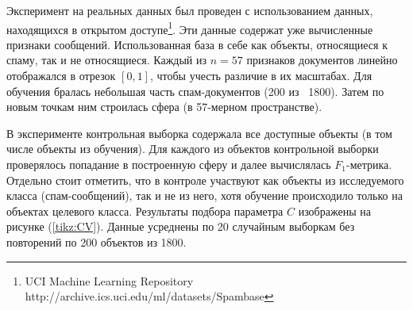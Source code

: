 Эксперимент на реальных данных был проведен с использованием данных, находящихся в открытом доступе\footnote{UCI Machine Learning Repository \textsf{http://archive.ics.uci.edu/ml/datasets/Spambase}}. 
Эти данные содержат уже вычисленные признаки сообщений.
Использованная база в себе как объекты, относящиеся к спаму, так и не относящиеся.
Каждый из $n = 57$ признаков документов линейно отображался в отрезок $[0, 1]$, чтобы учесть различие в их масштабах. 
Для обучения бралась небольшая часть спам-документов (200 из ~1800).
Затем по новым точкам ним строилась сфера (в 57-мерном пространстве).

В эксперименте контрольная выборка содержала все доступные объекты (в том числе объекты из обучения). 
Для каждого из объектов контрольной выборки проверялось попадание в построенную сферу и далее вычислялась $F_1$-метрика.
Отдельно стоит отметить, что в контроле участвуют как объекты из исследуемого класса (спам-сообщений), так и не из него, хотя обучение происходило только на объектах целевого класса.
Результаты подбора параметра $C$ изображены на рисунке (\ref{tikz:CV}). Данные усреднены по 20 случайным выборкам без повторений по 200 объектов из 1800.

